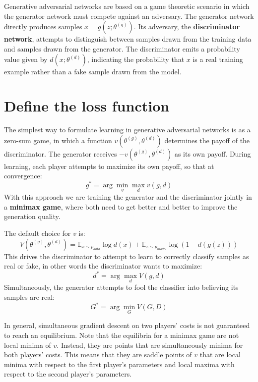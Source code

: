 Generative adversarial networks are based on a game theoretic scenario in which the generator network must 
compete against an adversary. The generator network directly produces samples $x = g(z; \theta^{(g)})$. 
Its adversary, the \textbf{discriminator network}, attempts to distinguish between samples drawn from the 
training data and samples drawn from the generator. The discriminator emits a probability value given by 
$d(x; \theta^{(d)})$, indicating the probability that $x$ is a real training example rather than a fake 
sample drawn from the model.
\section{Define the loss function}
The simplest way to formulate learning in generative adversarial networks is as a zero-sum game, in which 
a function $v(\theta^{(g)}, \theta^{(d)})$ determines the payoff of the discriminator. The generator 
receives $- v(\theta^{(g)}, \theta^{(d)})$ as its own payoff. During learning, each player attempts to 
maximize its own payoff, so that at convergence:
\begin{equation}
    g^\ast = \arg \min_{g} \max_{d} v(g, d)
\end{equation}
With this approach we are training the generator and the discriminator jointly in a \textbf{minimax game}, where 
both need to get better and better to improve the generation quality.

The default choice for $v$ is:
\begin{equation}
    V(\theta^{(g)}, \theta^{(d)}) = \mathbb{E}_{x \sim p_{data}} \log d(x) + \mathbb{E}_{z \sim p_{model}} \log(1 - d(g(z)))
\end{equation}
This drives the discriminator to attempt to learn to correctly classify samples as real or fake, in 
other words the discriminator wants to maximize:
\begin{equation*}
    d^\ast = \arg \max_d V(g,d)
\end{equation*}
Simultaneously, the generator attempts to fool the classifier into believing its samples are real:
\begin{equation*}
    G^\ast = \arg \min_G V(G,D)
\end{equation*}

In general, simultaneous gradient descent on two players’ costs is not guaranteed to reach an equilibrium. 
Note that the equilibria for a minimax game are not local minima of $v$. Instead, they are points that are 
simultaneously minima for both players’ costs. This means that they are saddle points of $v$ that are 
local minima with respect to the first player’s parameters and local maxima with respect to the second 
player's parameters.

